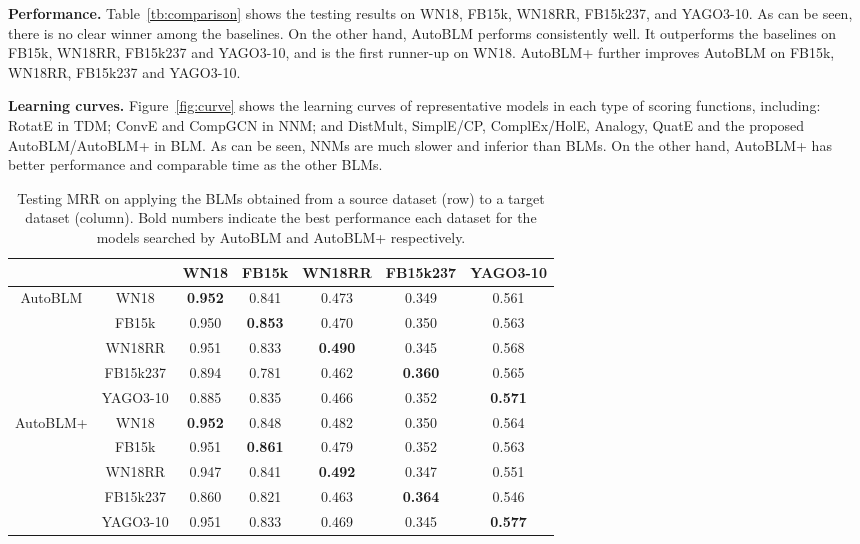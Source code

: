 \documentclass[10pt,journal,compsoc]{IEEEtran}
\begin{document}
{\bf Performance.}
Table~\ref{tb:comparison}
shows
the testing results on
WN18, FB15k, WN18RR, FB15k237, and YAGO3-10.
As can be seen,
there is no clear winner
among the baselines.
On the other hand,
AutoBLM
performs consistently well.
It outperforms the baselines on FB15k, WN18RR, FB15k237 and YAGO3-10,
and is the first runner-up on WN18.
AutoBLM+
further improves AutoBLM on FB15k, WN18RR, FB15k237 and YAGO3-10.


\noindent
{\bf 
Learning curves.}
Figure~\ref{fig:curve}
shows the learning curves of 
representative models in each type of scoring functions,
including: RotatE in TDM;
ConvE and CompGCN in NNM; and 
DistMult, SimplE/CP, ComplEx/HolE, Analogy, QuatE 
and the proposed AutoBLM/AutoBLM+
in BLM.
As can be seen,
NNMs 
are much slower and inferior than 
BLMs.
On the other hand, 
AutoBLM+
has 
better performance 
and comparable time as the other BLMs.




\begin{table}[t]
	\centering
	\vspace{-5px}
	\caption{Testing MRR on applying the BLMs obtained
		from a source dataset (row) to a target dataset (column). 
		Bold numbers indicate the best performance each dataset for the models searched 
		by AutoBLM and AutoBLM+ respectively.}
	\label{tb:sf-dependent}
	\setlength\tabcolsep{1.5pt}
	\vspace{-10px}
	\begin{tabular}{cc|ccccc}
		\toprule
		& &	WN18	& 	FB15k	& 	WN18RR	&	FB15k237	& 	YAGO3-10		\\
		\midrule
		\multirow{5}{*}{AutoBLM} & WN18		& 	\textbf{0.952}			& 0.841	&	0.473	&	0.349	&	0.561	\\
		& FB15k		& 	0.950	&	\textbf{0.853}   &	0.470	&	0.350	&	0.563	\\
		& WN18RR	& 	0.951	&	 0.833	&	\textbf{0.490}	&	0.345	&	0.568	\\
		& FB15k237	& 	0.894	&	0.781	&	0.462	&	 \textbf{0.360}	&	0.565	\\
		& YAGO3-10	& 	0.885	&	0.835	&	0.466	& 0.352    &	\textbf{0.571}	\\
		\midrule
		\multirow{5}{*}{AutoBLM+} & WN18		& 	\textbf{0.952}	 	&	0.848	&	0.482	&	0.350	&	0.564	\\
		& FB15k		& 	0.951	&	\textbf{0.861 }  &		0.479	&	0.352	&	0.563	\\
		& WN18RR	& 		0.947	&	0.841	&	\textbf{0.492}	&	0.347	&	0.551	\\
		& FB15k237	& 	0.860	&	0.821	&	0.463	&	 \textbf{0.364}	&	0.546	\\
		& YAGO3-10	& 	0.951	&	0.833	&	0.469	&	0.345	&	\textbf{0.577}	\\
		\bottomrule
	\end{tabular}	
	\vspace{-8px}
\end{table}
\end{document}
